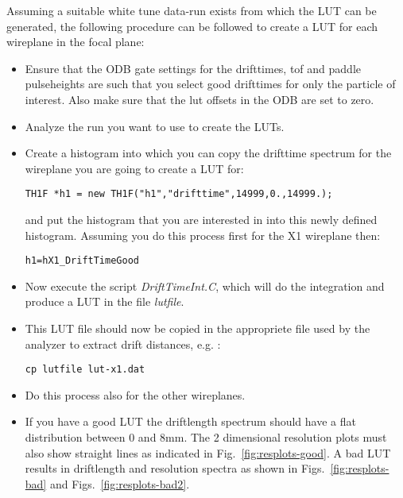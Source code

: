 \documentclass[11pt]{report}
\begin{document}
Assuming a suitable white tune data-run exists from which the LUT can be generated,
the following procedure can be followed to create a LUT for each wireplane in the focal plane:


\begin{itemize}

\item Ensure that the ODB gate settings for the drifttimes, tof and paddle pulseheights are
such that you select good drifttimes for only the particle of interest. 
Also make sure that the lut offsets in the ODB are set to zero.

\item Analyze the run you want to use to create the LUTs.

\item Create a histogram into which you can copy the drifttime spectrum for the wireplane
you are going to create a LUT for:
\begin{verbatim}
TH1F *h1 = new TH1F("h1","drifttime",14999,0.,14999.); 
\end{verbatim}
and put the histogram that you are interested in into this newly defined histogram.
Assuming you do this process first for the X1 wireplane then:
\begin{verbatim}
h1=hX1_DriftTimeGood
\end{verbatim}

\item Now execute the script {\it DriftTimeInt.C}, which will do the integration
and produce a LUT in the file {\it lutfile}.

\item This LUT file should now be copied in the appropriete file used by the analyzer
to extract drift distances, e.g. :
\begin{verbatim}
cp lutfile lut-x1.dat
\end{verbatim}


\item Do this process also for the other wireplanes.

\item  If you have a good LUT the driftlength spectrum should have a flat distribution
between 0 and 8mm. The 2 dimensional resolution plots must also show straight lines
as indicated in Fig.~\ref{fig:resplots-good}.
A bad LUT results in driftlength and resolution spectra as shown in 
Figs.~\ref{fig:resplots-bad}  and Figs.~\ref{fig:resplots-bad2}.


\end{itemize}
\end{document}
